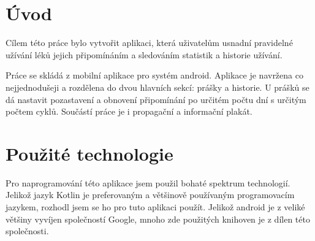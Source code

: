 \documentclass[a4paper,12pt]{report}
\begin{document}

\tableofcontents


\chapter*{Úvod}

Cílem této práce bylo vytvořit aplikaci, která uživatelům usnadní pravidelné užívání léků jejich připomínáním a sledováním statistik a historie užívání.

Práce se skládá z mobilní aplikace pro systém android. Aplikace je navržena co nejjednodušeji a rozdělena do dvou hlavních sekcí: prášky a historie. U prášků se dá nastavit pozastavení a obnovení připomínání po určitém počtu dní s určitým počtem cyklů. Součástí práce je i propagační a informační plakát. 

\chapter{Použité technologie}

Pro naprogramování této aplikace jsem použil bohaté spektrum technologií. Jelikož jazyk Kotlin je preferovaným a většinově používaným programovacím jazykem, rozhodl jsem se ho pro tuto aplikaci použít. Jelikož android je z veliké většiny vyvíjen společností Google, mnoho zde použitých knihoven je z dílen této společnosti.
\end{document}
